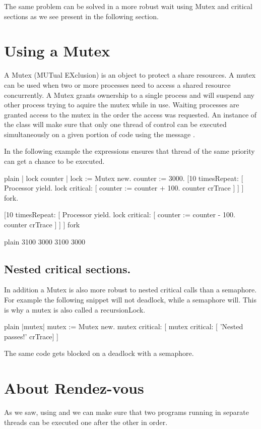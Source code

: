 \documentclass[10pt,twoside,english]{_support/latex/sbabook/sbabook}
\begin{document}
The same problem can be solved in a more robust wait using Mutex and critical sections
as we see present in the following section.
\section{Using a Mutex}
A Mutex (MUTual EXclusion) is an object to protect a share resources. 
A mutex can be used when two or more processes need to access a shared resource concurrently. 
A Mutex grants ownership to a single process and will suspend any other process trying to aquire the mutex while in use. Waiting processes are granted access to the mutex in the order the access was requested.
An instance of the class  will make sure that only one thread of control can be executed simultaneously on a given portion of code using the message .

In the following example the expressions  ensures that thread of the same priority can get a chance to be executed. 

\begin{displaycode}{plain}
| lock counter |
lock := Mutex new.
counter := 3000.
[10 timesRepeat: [ 
	Processor yield.
	lock critical: [ counter := counter + 100.
						counter crTrace ] ]
	] fork.

[10 timesRepeat: [ 
	Processor yield.
	lock critical: [ counter := counter - 100.
					counter crTrace ] ]
	] fork
\end{displaycode}

\begin{displaycode}{plain}
3100
3000
3100
3000
\end{displaycode}
\subsection{Nested critical sections.}
In addition a Mutex is also more robust  to nested critical calls than a semaphore.
For example the following snippet will not deadlock, while a semaphore will. This is why a mutex is also called a recursionLock.

\begin{displaycode}{plain}
|mutex|
mutex := Mutex new. 
mutex critical: [ mutex critical: [ 'Nested passes!' crTrace] ]
\end{displaycode}

The same code gets blocked on a deadlock with a semaphore.
\section{About Rendez-vous}
As we saw, using  and  we can  make sure that two programs running in separate threads can be executed one after the other in order.
\end{document}
